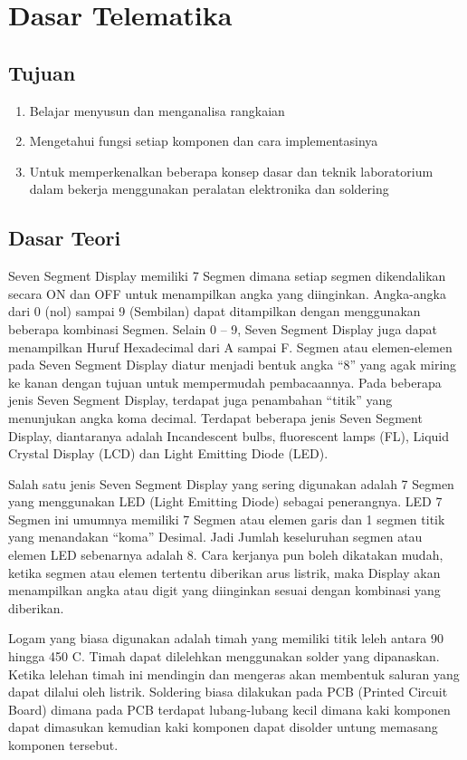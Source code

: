 \chapter{Dasar Telematika}

\section{Tujuan}
\begin{enumerate}
    \item Belajar menyusun dan menganalisa rangkaian
    \item Mengetahui fungsi setiap komponen dan cara implementasinya
    \item Untuk memperkenalkan beberapa konsep dasar dan teknik laboratorium dalam bekerja menggunakan peralatan elektronika dan soldering
\end{enumerate}

\section{Dasar Teori}
Seven Segment Display memiliki 7 Segmen dimana setiap segmen dikendalikan secara ON dan OFF untuk menampilkan angka yang diinginkan. 
Angka-angka dari 0 (nol) sampai 9 (Sembilan) dapat ditampilkan dengan menggunakan beberapa kombinasi Segmen. Selain 0 – 9, Seven Segment 
Display juga dapat menampilkan Huruf Hexadecimal dari A sampai F. Segmen atau elemen-elemen pada Seven Segment Display diatur menjadi 
bentuk angka “8” yang agak miring ke kanan dengan tujuan untuk mempermudah pembacaannya. Pada beberapa jenis Seven Segment Display, 
terdapat juga penambahan “titik” yang menunjukan angka koma decimal.  Terdapat beberapa jenis Seven Segment Display, diantaranya adalah 
Incandescent bulbs, fluorescent lamps (FL), Liquid Crystal Display (LCD) dan Light Emitting Diode (LED).

Salah satu jenis Seven Segment Display yang sering digunakan adalah 7 Segmen yang menggunakan LED (Light Emitting Diode) sebagai penerangnya.  
LED 7 Segmen ini umumnya memiliki 7 Segmen atau elemen garis dan 1 segmen titik yang menandakan “koma” Desimal. Jadi Jumlah keseluruhan segmen 
atau elemen LED sebenarnya adalah 8. Cara kerjanya pun boleh dikatakan mudah, ketika segmen atau elemen tertentu diberikan arus listrik, maka 
Display akan menampilkan angka atau digit yang diinginkan sesuai dengan kombinasi yang diberikan.

Logam yang biasa digunakan adalah timah yang memiliki titik leleh antara 90 hingga 450 \degree C. Timah dapat dilelehkan menggunakan solder yang dipanaskan. 
Ketika lelehan timah ini mendingin dan mengeras akan membentuk saluran yang dapat dilalui oleh listrik.  Soldering biasa dilakukan pada PCB (Printed Circuit Board) 
dimana pada PCB terdapat lubang-lubang kecil dimana kaki komponen dapat dimasukan kemudian kaki komponen dapat disolder untung memasang komponen tersebut.

